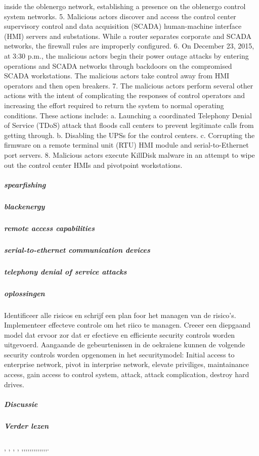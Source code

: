 inside the oblenergo network, establishing a presence
on the oblenergo control system networks.
5. Malicious actors discover and access the control center
supervisory control and data acquisition (SCADA)
human-machine interface (HMI) servers and
substations. While a router separates corporate and
SCADA networks, the firewall rules are improperly
configured.
6. On December 23, 2015, at 3:30 p.m., the malicious
actors begin their power outage attacks by entering
operations and SCADA networks through backdoors on
the compromised SCADA workstations. The malicious
actors take control away from HMI operators and then
open breakers.
7. The malicious actors perform several other actions with
the intent of complicating the responses of control
operators and increasing the effort required to return the
system to normal operating conditions. These actions
include:
a. Launching a coordinated Telephony Denial of
Service (TDoS) attack that floods call centers to
prevent legitimate calls from getting through.
b. Disabling the UPSs for the control centers.
c. Corrupting the firmware on a remote terminal unit
(RTU) HMI module and serial-to-Ethernet port
servers.
8. Malicious actors execute KillDisk malware in an
attempt to wipe out the control center HMIs and pivotpoint workstations.
\cite{Whitehead2017ukrainepoweroutage}
\cite{boozallen2016lightwentout}
\subparagraph{spearfishing}
\subparagraph{blackenergy}
\subparagraph{remote access capabilities}
\subparagraph{serial-to-ethernet communication devices}
\subparagraph{telephony denial of service attacks}
\subparagraph{oplossingen}
Identificeer alle risicos en schrijf een plan foor het managen van de risico's.
Implementeer  effecteve controle  om het riico te managen.
Creeer een diepgaand model dat ervoor zor dat er efectieve en efficiente security controls worden uitgevoerd.
Aangaande de gebeurtenissen in de oekraiene kunnen de volgende security controls worden opgenomen in het securitymodel: Initial access to enterprise network, pivot in interprise network, elevate priviliges, maintainance access, gain access to control system, attack, attack complication, destroy hard drives.
\cite{Whitehead2017ukrainepoweroutage}
\subparagraph{Discussie}
\subparagraph{Verder lezen}
\cite{shahzad2014ScadaProtocolsPollingScenario},
\cite{grammatikis2019AttackIEC6087505104},
\cite{2017win32industroyer},
\cite{yadav2020reviewScadaArchitecture},
\cite{arrizabalaga2020surveyiiotProtocols},\cite{fauri2017EncryptionICS},\cite{resch31102019IEC62351secureCommunication},\cite{levalle2020FuzzingICSProtocols},\cite{blackhatusa2017},\cite{blackhatusa2017},\cite{abb30062017crashoverridenotification},\cite{spinner2018crashoverrideiot},\cite{njccicthreat08102017crashovverrideprofile},\cite{slowikvb2018crashoverride},\cite{crashoverridenetwork},\cite{wikiindustroyer},\cite{icsSecurityRussianHacking},\cite{holappa2017threattoElectricityNetworks}.

